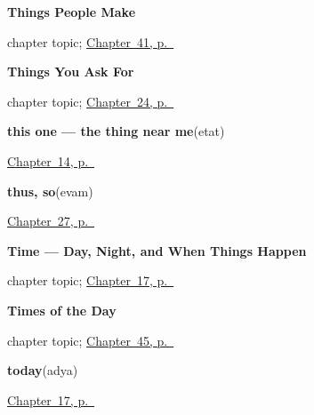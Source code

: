 \noindent\begin{minipage}[t]{\linewidth}
\raggedright
\textbf{Things People Make}\par
\footnotesize chapter topic; \hyperref[ch:sa-things-people-make]{Chapter~41, p.~\pageref*{ch:sa-things-people-make}}
\end{minipage}\par\smallskip

\noindent\begin{minipage}[t]{\linewidth}
\raggedright
\textbf{Things You Ask For}\par
\footnotesize chapter topic; \hyperref[ch:sa-ask-for]{Chapter~24, p.~\pageref*{ch:sa-ask-for}}
\end{minipage}\par\smallskip

\noindent\begin{minipage}[t]{\linewidth}
\raggedright
\textbf{this one — the thing near me}\enspace\emph{}\enspace(etat)\par
\footnotesize \hyperref[ch:sa-pointing-and-asking]{Chapter~14, p.~\pageref*{ch:sa-pointing-and-asking}}
\end{minipage}\par\smallskip

\noindent\begin{minipage}[t]{\linewidth}
\raggedright
\textbf{thus, so}\enspace\emph{}\enspace(evam)\par
\footnotesize \hyperref[ch:sa-replies]{Chapter~27, p.~\pageref*{ch:sa-replies}}
\end{minipage}\par\smallskip

\noindent\begin{minipage}[t]{\linewidth}
\raggedright
\textbf{Time --- Day, Night, and When Things Happen}\par
\footnotesize chapter topic; \hyperref[ch:sa-time]{Chapter~17, p.~\pageref*{ch:sa-time}}
\end{minipage}\par\smallskip

\noindent\begin{minipage}[t]{\linewidth}
\raggedright
\textbf{Times of the Day}\par
\footnotesize chapter topic; \hyperref[ch:sa-times-of-the-day]{Chapter~45, p.~\pageref*{ch:sa-times-of-the-day}}
\end{minipage}\par\smallskip

\noindent\begin{minipage}[t]{\linewidth}
\raggedright
\textbf{today}\enspace\emph{}\enspace(adya)\par
\footnotesize \hyperref[ch:sa-time]{Chapter~17, p.~\pageref*{ch:sa-time}}
\end{minipage}\par\smallskip

